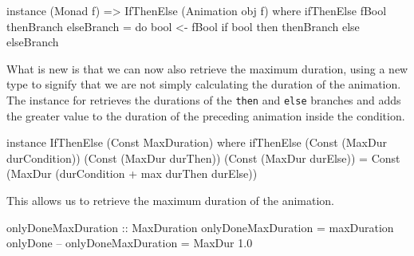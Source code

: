 \begin{code}
instance (Monad f) => IfThenElse (Animation obj f) where
  ifThenElse fBool thenBranch elseBranch = do
    bool <- fBool
    if bool then thenBranch else elseBranch
\end{code}

What is new is that we can now also retrieve the maximum duration, using a new type
 to signify that we are not simply calculating the duration of
the animation. The instance for  retrieves the
durations of the \texttt{then} and \texttt{else} branches and adds the greater
value to the duration of the preceding animation inside the condition.

\begin{code}
instance IfThenElse (Const MaxDuration) where
  ifThenElse (Const (MaxDur durCondition))
             (Const (MaxDur durThen))
             (Const (MaxDur durElse)) =
    Const (MaxDur (durCondition + max durThen durElse))
\end{code}

This allows us to retrieve the maximum duration of the  animation.

\begin{spec}
onlyDoneMaxDuration :: MaxDuration
onlyDoneMaxDuration = maxDuration onlyDone
-- onlyDoneMaxDuration = MaxDur 1.0
\end{spec}
